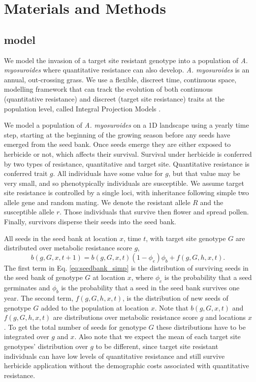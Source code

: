 \documentclass[10pt,letterpaper]{article}
\begin{document}
\section*{Materials and Methods}
\subsection*{model}
We model the invasion of a target site resistant genotype into a population of \textit{A. myosuroides} where quantitative resistance can also develop. \textit{A. myosuroides} is an annual, out-crossing grass. We use a flexible, discreet time, continuous space, modelling framework that can track the evolution of both continuous (quantitative resistance) and discreet (target site resistance) traits at the population level, called Integral Projection Models \cite{Elln2006}.     

We model a population of \textit{A. myosuroides} on a 1D landscape using a yearly time step, starting at the beginning of the growing season before any seeds have emerged from the seed bank. Once seeds emerge they are either exposed to herbicide or not, which affects their survival. Survival under herbicide is conferred by two types of resistance, quantitative and target site. Quantitative resistance is conferred trait $g$. All individuals have some value for $g$, but that value may be very small, and so phenotypically individuals are susceptible. We assume target site resistance is controlled by a single loci, with inheritance following simple two allele gene and random mating. We denote the resistant allele $R$ and the susceptible allele $r$. Those individuals that survive then flower and spread pollen. Finally, survivors disperse their seeds into the seed bank.  

All seeds in the seed bank at location $x$, time $t$, with target site genotype $G$ are distributed over metabolic resistance score $g$,
\begin{equation}\label{eq:seedbank_simp}
	b(g, G, x, t + 1) = b(g, G, x, t)(1 - \phi_e)\phi_b + f(g, G, h, x, t). 
\end{equation}
The first term in Eq. \ref{eq:seedbank_simp} is the distribution of surviving seeds in the seed bank of genotype $G$ at location $x$, where $\phi_e$ is the probability that a seed germinates and $\phi_b$ is the probability that a seed in the seed bank survives one year. The second term, $f(g, G, h, x, t)$, is the distribution of new seeds of genotype $G$ added to the population at location $x$. Note that $b(g, G, x, t)$ and $f(g, G, h, x, t)$ are distributions over metabolic resistance score $g$ and locations $x$. To get the total number of seeds for genotype $G$ these distributions have to be integrated over $g$ and $x$. Also note that we expect the mean of each target site genotypes' distribution over $g$ to be different, since target site resistant individuals can have low levels of quantitative resistance and still survive herbicide application without the demographic costs associated with quantitative resistance. 
\end{document}
